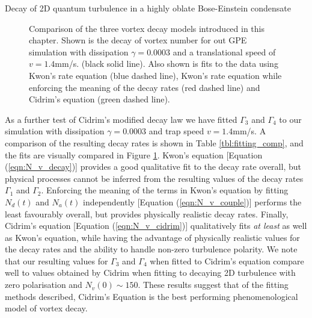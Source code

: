 \begin{chapter}{\label{cha:shin}Decay of 2D quantum turbulence in a highly oblate Bose-Einstein condensate}
\begin{figure}
\begin{center}
\end{center}
\caption{\label{fig:fitting_comp} Comparison of the three vortex decay models introduced in this chapter. Shown is the decay of vortex number for out GPE simulation with dissipation $\gamma=0.0003$ and a translational speed of $v=1.4$mm/s. (black solid line). Also shown is fits to the data using Kwon's rate equation (blue dashed line), Kwon's rate equation while enforcing the meaning of the decay rates (red dashed line) and Cidrim's equation (green dashed line).}
\end{figure}

As a further test of Cidrim's modified decay law we have fitted $\Gamma_3$ and $\Gamma_4$ to our simulation with dissipation $\gamma=0.0003$ and trap speed $v=1.4$mm/s. A comparison of the resulting decay rates is shown in Table \ref{tbl:fitting_comp}, and the fits are visually compared in Figure \ref{fig:fitting_comp}. Kwon's equation [Equation (\ref{eqn:N_v_decay})] provides a good qualitative fit to the decay rate overall, but physical processes cannot be inferred from the resulting values of the decay rates $\Gamma_1$ and $\Gamma_2$. Enforcing the meaning of the terms in Kwon's equation by fitting $N_d(t)$ and $N_a(t)$ independently [Equation (\ref{eqn:N_v_couple})] performs the least favourably overall, but provides physically realistic decay rates. Finally, Cidrim's equation [Equation (\ref{eqn:N_v_cidrim})] qualitatively fits {\it at least} as well as Kwon's equation, while having the advantage of physically realistic values for the decay rates and the ability to handle non-zero turbulence polarity. We note that our resulting values for $\Gamma_3$ and $\Gamma_4$ when fitted to Cidrim's equation compare well to values obtained by Cidrim \etal when fitting to decaying 2D turbulence with zero polarisation and $N_v(0) \sim 150$. These results suggest that of the fitting methods described, Cidrim's Equation is the best performing phenomenological model of vortex decay.


\end{chapter}
